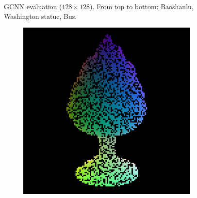 \begin{figure}
	\decoRule
	\caption{GCNN evaluation ($ 128\times128 $). From top to bottom: Baoshanlu, Washington statue, Bus. }
	\label{fig:gcnn-eval-more}
\end{figure}



\begin{figure}
	\centering
	\captionsetup{width=\linewidth}
	\begin{subfigure}[b]{0.19\linewidth}
		\includegraphics[width=\linewidth]{./Figures/gcnn_synthetic/fancy_eval_2_point_cloud_noise.png}
	\end{subfigure}
	\begin{subfigure}[b]{0.19\linewidth}

\end{subfigure}
\end{figure}
